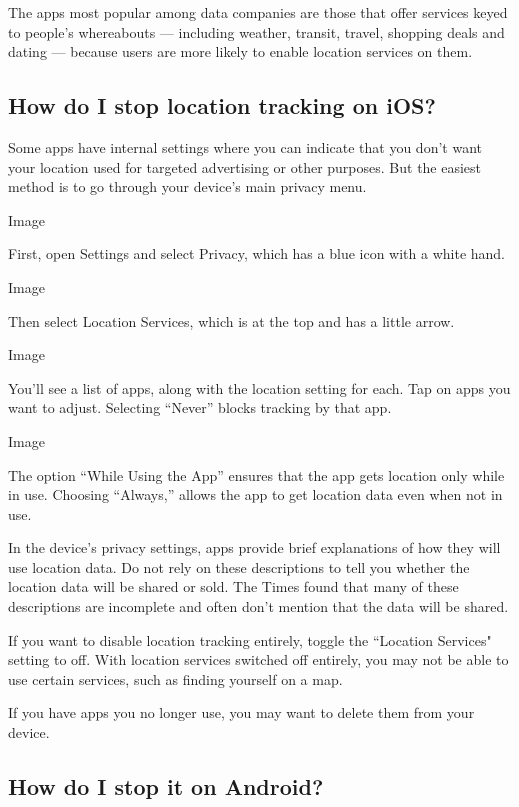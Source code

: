The apps most popular among data companies are those that offer services
keyed to people's whereabouts --- including weather, transit, travel,
shopping deals and dating --- because users are more likely to enable
location services on them.

\hypertarget{how-do-i-stop-location-tracking-on-ios}{%
\subsection{How do I stop location tracking on
iOS?}\label{how-do-i-stop-location-tracking-on-ios}}

Some apps have internal settings where you can indicate that you don't
want your location used for targeted advertising or other purposes. But
the easiest method is to go through your device's main privacy menu.

Image

First, open Settings and select Privacy, which has a blue icon with a
white hand.

Image

Then select Location Services, which is at the top and has a little
arrow.

Image

You'll see a list of apps, along with the location setting for each. Tap
on apps you want to adjust. Selecting ``Never'' blocks tracking by that
app.

Image

The option ``While Using the App'' ensures that the app gets location
only while in use. Choosing ``Always,'' allows the app to get location
data even when not in use.

In the device's privacy settings, apps provide brief explanations of how
they will use location data. Do not rely on these descriptions to tell
you whether the location data will be shared or sold. The Times found
that many of these descriptions are incomplete and often don't mention
that the data will be shared.

If you want to disable location tracking entirely, toggle the ``Location
Services" setting to off. With location services switched off entirely,
you may not be able to use certain services, such as finding yourself on
a map.

If you have apps you no longer use, you may want to delete them from
your device.

\hypertarget{how-do-i-stop-it-on-android}{%
\subsection{How do I stop it on
Android?}\label{how-do-i-stop-it-on-android}}

